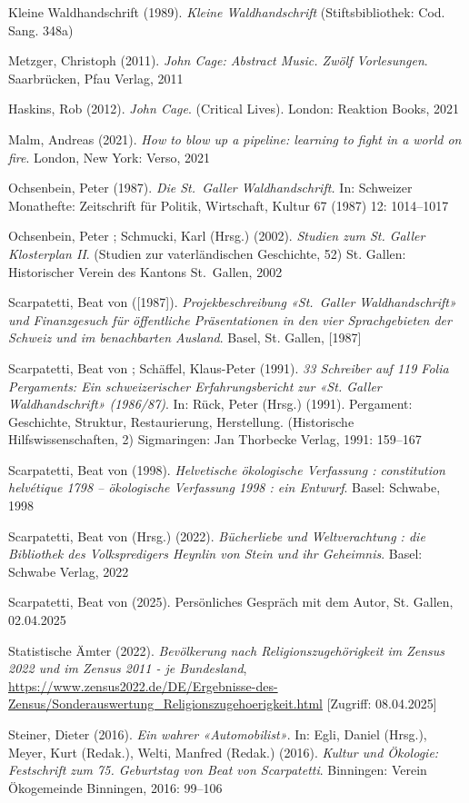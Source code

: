 \documentclass[a4paper,
fontsize=11pt,
oneside,
numbers=noperiodatend,
parskip=half-,
bibliography=totoc,
final
]{scrartcl}
\begin{document}
Kleine Waldhandschrift (1989). \emph{Kleine Waldhandschrift}
(Stiftsbibliothek: Cod. Sang. 348a)

Metzger, Christoph (2011). \emph{John Cage: Abstract Music. Zwölf
Vorlesungen}. Saarbrücken, Pfau Verlag, 2011

Haskins, Rob (2012). \emph{John Cage}. (Critical Lives). London:
Reaktion Books, 2021

Malm, Andreas (2021). \emph{How to blow up a pipeline: learning to fight
in a world on fire}. London, New York: Verso, 2021

Ochsenbein, Peter (1987). \emph{Die St.~Galler Waldhandschrift.} In:
Schweizer Monathefte: Zeitschrift für Politik, Wirtschaft, Kultur 67
(1987) 12: 1014--1017

Ochsenbein, Peter ; Schmucki, Karl (Hrsg.) (2002). \emph{Studien zum St.
Galler Klosterplan II}. (Studien zur vaterländischen Geschichte, 52) St.
Gallen: Historischer Verein des Kantons St.~Gallen, 2002

Scarpatetti, Beat von ({[}1987{]}). \emph{Projekbeschreibung «St.~Galler
Waldhandschrift» und Finanzgesuch für öffentliche Präsentationen in den
vier Sprachgebieten der Schweiz und im benachbarten Ausland}. Basel, St.
Gallen, {[}1987{]}

Scarpatetti, Beat von ; Schäffel, Klaus-Peter (1991). \emph{33 Schreiber
auf 119 Folia Pergaments: Ein schweizerischer Erfahrungsbericht zur «St.
Galler Waldhandschrift» (1986/87)}. In: Rück, Peter (Hrsg.) (1991).
Pergament: Geschichte, Struktur, Restaurierung, Herstellung.
(Historische Hilfswissenschaften, 2) Sigmaringen: Jan Thorbecke Verlag,
1991: 159--167

Scarpatetti, Beat von (1998). \emph{Helvetische ökologische Verfassung :
constitution helvétique 1798 -- ökologische Verfassung 1998 : ein
Entwurf}. Basel: Schwabe, 1998

Scarpatetti, Beat von (Hrsg.) (2022). \emph{Bücherliebe und
Weltverachtung : die Bibliothek des Volkspredigers Heynlin von Stein und
ihr Geheimnis}. Basel: Schwabe Verlag, 2022

Scarpatetti, Beat von (2025). Persönliches Gespräch mit dem Autor, St.
Gallen, 02.04.2025

Statistische Ämter (2022). \emph{Bevölkerung nach Religionszugehörigkeit
im Zensus 2022 und im Zensus 2011 - je Bundesland},
\url{https://www.zensus2022.de/DE/Ergebnisse-des-Zensus/Sonderauswertung_Religionszugehoerigkeit.html}
{[}Zugriff: 08.04.2025{]}

Steiner, Dieter (2016). \emph{Ein wahrer «Automobilist»}. In: Egli,
Daniel (Hrsg.), Meyer, Kurt (Redak.), Welti, Manfred (Redak.) (2016).
\emph{Kultur und Ökologie: Festschrift zum 75. Geburtstag von Beat von
Scarpatetti}. Binningen: Verein Ökogemeinde Binningen, 2016: 99--106
\end{document}
